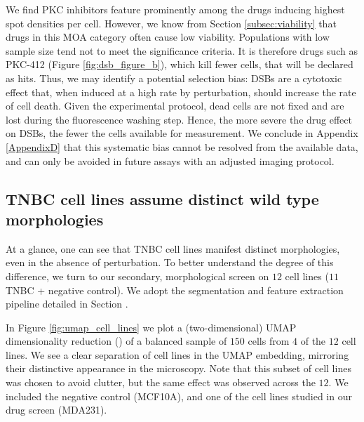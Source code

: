 We find PKC inhibitors feature prominently among the drugs inducing highest spot densities per cell. However, we know from Section \ref{subsec:viability} that drugs in this MOA category often cause low viability. Populations with low sample size tend not to meet the significance criteria. It is therefore drugs such as PKC-412 (Figure \ref{fig:dsb_figure_b}), which kill fewer cells, that will be declared as hits. Thus, we may identify a potential selection bias: DSBs are a cytotoxic effect that, when induced at a high rate by perturbation, should increase the rate of cell death. Given the experimental protocol, dead cells are not fixed and are lost during the fluorescence washing step. Hence, the more severe the drug effect on DSBs, the fewer the cells available for measurement. We conclude in Appendix \ref{AppendixD} that this systematic bias cannot be resolved from the available data, and can only be avoided in future assays with an adjusted imaging protocol.

%

\subsection{TNBC cell lines assume distinct wild type morphologies}
\label{subsec:tnbc_classification}

At a glance, one can see that TNBC cell lines manifest distinct morphologies, even in the absence of perturbation. To better understand the degree of this difference, we turn to our secondary, morphological screen on $12$ cell lines ($11$ TNBC + negative control). We adopt the segmentation and feature extraction pipeline detailed in Section \label{sec:cell_measurement}.

In Figure \ref{fig:umap_cell_lines} we plot a (two-dimensional) UMAP dimensionality reduction (\cite{mcinnes2018umap}) of a balanced sample of $150$ cells from $4$ of the $12$ cell lines. We see a clear separation of cell lines in the UMAP embedding, mirroring their distinctive appearance in the microscopy. Note that this subset of cell lines was chosen to avoid clutter, but the same effect was observed across the $12$. We included the negative control (MCF10A), and one of the cell lines studied in our drug screen (MDA231).

